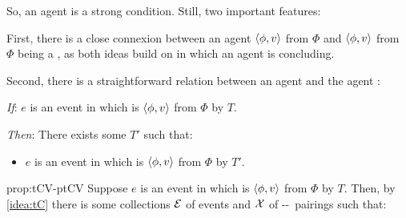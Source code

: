 \begin{note}
  So, an agent  is a strong condition.
  Still, two important features:

  First, there is a close connexion between an agent \ptCV{} \(\langle \phi, v \rangle\) from \(\Phi\) and \(\langle \phi, v \rangle\) from \(\Phi\) being a \fc{}, as both ideas build on  in which an agent is concluding.

  Second, there is a straightforward relation between an agent \tCV{} and the agent :

  \begin{proposition}%
    \label{prop:tCV-ptCV}%

    \noindent%

    \begin{itenum}
    \item[\emph{If}:]
      \(e\) is an event in which \vAgent{} is \tCV{} \(\langle \phi, v \rangle\) from \(\Phi\) by \torNa{} \(T\).
    \item[\emph{Then}:]
      There exists some \torN{} \(T'\) such that:
      \begin{itemize}
      \item
        \(e\) is an event in which \vAgent{} is \ptCV{} \(\langle \phi, v \rangle\) from \(\Phi\) by \torNa{} \(T'\).
      \end{itemize}
    \end{itenum}
    \vspace{-\baselineskip}
  \end{proposition}

  \begin{argument}{prop:tCV-ptCV}
    Suppose  \(e\) is an event in which \vAgent{} is \tCV{} \(\langle \phi, v \rangle\) from \(\Phi\) by \torN{} \(T\).
    Then, by \autoref{idea:tC} there is some collections \({\cal E}\) of events and \({\cal X}\) of --~pairings such that:


\end{argument}
\end{note}
